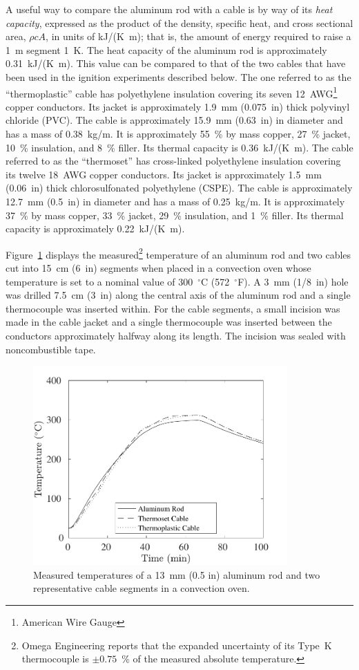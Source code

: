 A useful way to compare the aluminum rod with a cable is by way of its {\em heat capacity}, expressed as the product of the density, specific heat, and cross sectional area, $\rho c A$, in units of kJ/(K~m); that is, the amount of energy required to raise a 1~m segment 1~K. The heat capacity of the aluminum rod is approximately 0.31~kJ/(K~m). This value can be compared to that of the two cables that have been used in the ignition experiments described below. The one referred to as the ``thermoplastic'' cable has polyethylene insulation covering its seven 12~AWG\footnote{American Wire Gauge} copper conductors. Its jacket is approximately 1.9~mm (0.075~in) thick polyvinyl chloride (PVC). The cable is approximately 15.9~mm (0.63~in) in diameter and has a mass of 0.38~kg/m. It is approximately 55~\% by mass copper, 27~\% jacket, 10~\% insulation, and 8~\% filler. Its thermal capacity is 0.36~kJ/(K~m). The cable referred to as the ``thermoset'' has cross-linked polyethylene insulation covering its twelve 18~AWG copper conductors. Its jacket is approximately 1.5~mm (0.06~in) thick chlorosulfonated polyethylene (CSPE). The cable is approximately 12.7~mm (0.5~in) in diameter and has a mass of 0.25~kg/m. It is approximately 37~\% by mass copper, 33~\% jacket, 29~\% insulation, and 1~\% filler. Its thermal capacity is approximately 0.22~kJ/(K~m).

Figure~\ref{oven} displays the measured\footnote{Omega Engineering reports that the expanded uncertainty of its Type~K thermocouple is $\pm 0.75$~\% of the measured absolute temperature.} temperature of an aluminum rod and two cables cut into 15~cm (6~in) segments when placed in a convection oven whose temperature is set to a nominal value of 300~$^\circ$C (572~$^\circ$F). A 3~mm (1/8~in) hole was drilled 7.5~cm (3~in) along the central axis of the aluminum rod and a single thermocouple was inserted within. For the cable segments, a small incision was made in the cable jacket and a single thermocouple was inserted between the conductors approximately halfway along its length. The incision was sealed with noncombustible tape.

\begin{figure}[!ht]
\centering
\includegraphics[height=3.0in]{../SCRIPT_FIGURES/Oven_Test}
\caption[Temperatures of cables and aluminum rod in convective oven]{Measured temperatures of a 13~mm (0.5 in) aluminum rod and two representative cable segments in a convection oven.}
\label{oven}
\end{figure}


